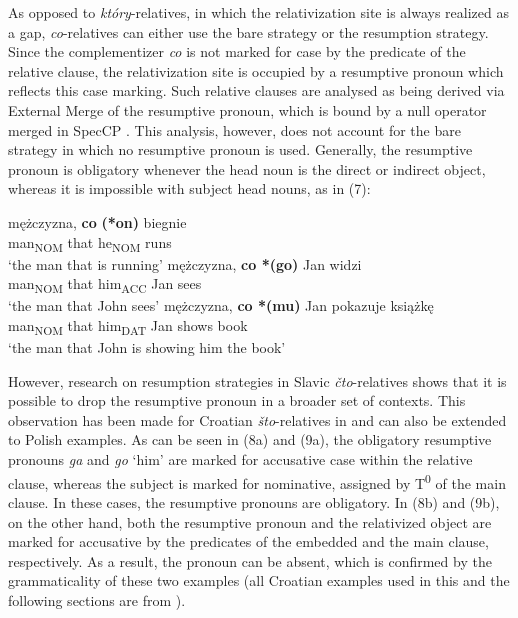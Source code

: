\documentclass[output=paper]{langsci/langscibook}
\begin{document}
As opposed to \textit{który}{}-relatives, in which the relativization site is always realized as a gap, \textit{co}{}-relatives can either use the bare strategy or the resumption strategy. Since the complementizer \textit{co} is not marked for case by the predicate of the relative clause, the relativization site is occupied by a resumptive pronoun which reflects this case marking. Such relative clauses are analysed as being derived via External Merge of the resumptive pronoun, which is bound by a null operator merged in SpecCP \citep{Borer1984,Chomsky1977,Lavine2003,McCloskey1990,McCloskey2002,Merchant2004,Safir1986,Shlonsky1992}. This analysis, however, does not account for the bare strategy in which no resumptive pronoun is used. Generally, the resumptive pronoun is obligatory whenever the head noun is the direct or indirect object, whereas it is impossible with subject head nouns, as in (7):

\ea%
    \label{ex:leska:7}
    \ea
    \gll mężczyzna,   \textbf{co}   \textbf{(*on)} biegnie\\
         man\textsubscript{NOM}   that   he\textsubscript{NOM} runs\\
    \glt ‘the man that is running’
    \ex
    \gll mężczyzna,   \textbf{co *(go)} Jan   widzi\\
         man\textsubscript{NOM}   that him\textsubscript{ACC}   Jan   sees\\
    \glt ‘the man that John sees’
    \ex
    \gll mężczyzna,   \textbf{co *(mu)}   Jan   pokazuje   książkę\\
         man\textsubscript{NOM}   that him\textsubscript{DAT}   Jan   shows   book\\
    \glt ‘the man that John is showing him the book’
    \z
\z    

However, research on resumption strategies in Slavic \textit{čto}{}-relatives shows that it is possible to drop the resumptive pronoun in a broader set of contexts. This observation has been made for Croatian \textit{što}{}-relatives in \citet[29]{Gračanin-Yuksek2013} and can also be extended to Polish examples. As can be seen in (8a) and (9a), the obligatory resumptive pronouns \textit{ga} and \textit{go} ‘him’ are marked for accusative case within the relative clause, whereas the subject is marked for nominative, assigned by T\textsuperscript{0} of the main clause. In these cases, the resumptive pronouns are obligatory. In (8b) and (9b), on the other hand, both the resumptive pronoun and the relativized object are marked for accusative by the predicates of the embedded and the main clause, respectively. As a result, the pronoun can be absent, which is confirmed by the grammaticality of these two examples (all Croatian examples used in this and the following sections are from \citealt{Gračanin-Yuksek2013}). 
\end{document}
